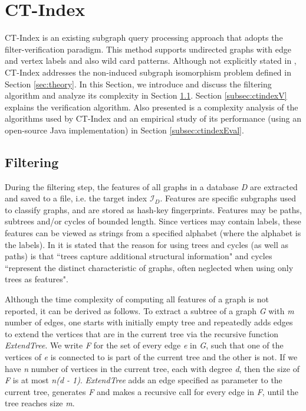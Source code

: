 \documentclass{l4proj}
\newcommand{\fancyI}{\mathcal{I}}
\begin{document}
\section{CT-Index}
\label{sec:ctindex}

CT-Index \cite{ctindex} is an existing subgraph query processing approach that adopts the filter-verification paradigm. This method supports undirected graphs with edge and vertex labels and also wild card patterns. Although not explicitly stated in \cite{ctindex}, CT-Index addresses the non-induced subgraph isomorphism problem defined in Section \ref{sec:theory}. In this Section, we introduce and discuss the filtering algorithm and analyze its complexity in Section \ref{subsec:ctindexF}. Section \ref{subsec:ctindexV} explains the verification algorithm. Also presented is a complexity analysis of the algorithms used by CT-Index and an empirical study of its performance (using an open-source Java implementation) in Section \ref{subsec:ctindexEval}.

\subsection{Filtering}
\label{subsec:ctindexF}
During the filtering step, the features of all graphs in a database \emph{D} are extracted and saved to a file, i.e. the target index $\fancyI_{D}$. Features are specific subgraphs used to classify graphs, and are stored as hash-key fingerprints. Features may be paths, subtrees and/or cycles of bounded length. Since vertices may contain labels, these features can be viewed as strings from a specified alphabet (where the alphabet is the labels). In \cite{ctindex} it is stated that the reason for using \glspl{tree} and cycles (as well as paths) is that ``trees capture additional structural information" and cycles ``represent the distinct characteristic of graphs, often neglected when using only trees as features".

Although the time complexity of computing all features of a graph is not reported, it can be derived as follows. To extract a subtree of a graph \emph{G} with \emph{m} number of edges, one starts with initially empty tree and repeatedly adds edges to extend the vertices that are in the current tree via the recursive function \emph{ExtendTree}. We write \emph{F} for the set of every edge \emph{e} in \emph{G}, such that one of the vertices of \emph{e} is connected to is part of the current tree and the other is not. If we have \emph{n} number of vertices in the current tree, each with degree \emph{d}, then the size of \emph{F} is at most \emph{n(d - 1)}. \emph{ExtendTree} adds an edge specified as parameter to the current tree, generates \emph{F} and makes a recursive call for every edge in \emph{F}, until the tree reaches size \emph{m}.
\end{document}
